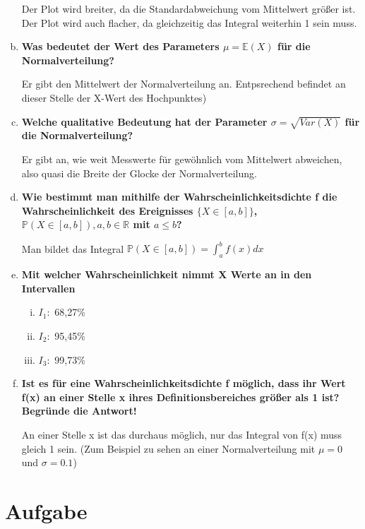 \documentclass[a4paper]{scrartcl}
\begin{document}
\begin{enumerate}[a)]
	Der Plot wird breiter, da die Standardabweichung vom Mittelwert größer ist. Der Plot wird auch flacher, da gleichzeitig das Integral weiterhin 1 sein muss.
	
	\item \textbf{Was bedeutet der Wert des Parameters $\mu = \mathbb{E}(X)$ für die Normalverteilung?}
	
Er gibt den Mittelwert der Normalverteilung an. Entpsrechend befindet an dieser Stelle der X-Wert des Hochpunktes)
	
	\item \textbf{Welche qualitative Bedeutung hat der Parameter $\sigma = \sqrt{Var(X)}$ für die Normalverteilung?}
	
	Er gibt an, wie weit Messwerte für gewöhnlich vom Mittelwert abweichen, also quasi die Breite der Glocke der Normalverteilung.
	
	\item \textbf{Wie bestimmt man mithilfe der Wahrscheinlichkeitsdichte f die Wahrscheinlichkeit des Ereignisses $\{ X \in [a,b]\}$, $\mathbb{P}(X\in[a,b]),a,b\in \mathbb{R}$ mit $a\le b$? }
	
	
	Man bildet das Integral $\mathbb{P}(X\in[a,b]) = \int_{a}^{b} f(x) dx$
	
	\item \textbf{Mit welcher Wahrscheinlichkeit nimmt X Werte an in den Intervallen}
	
	\begin{enumerate}[(i)]
		\item $I_1:$ 68,27\%
		\item $I_2:$ 95,45\%
		\item $I_3:$ 99,73\%
	\end{enumerate}	
	
	
	\item \textbf{Ist es für eine Wahrscheinlichkeitsdichte f möglich, dass ihr Wert f(x) an einer Stelle x ihres Definitionsbereiches größer als 1 ist? Begründe die Antwort!}
	
	An einer Stelle x ist das durchaus möglich, nur das Integral von f(x) muss gleich 1 sein. (Zum Beispiel zu sehen an einer Normalverteilung mit $\mu = 0$ und $\sigma = 0.1$)
	
\end{enumerate}

\section{Aufgabe}
\end{document}
